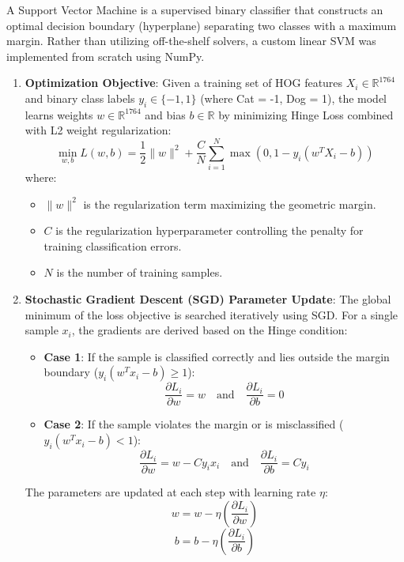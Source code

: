 \documentclass[12pt,a4paper]{article}
\begin{document}
A Support Vector Machine is a supervised binary classifier that constructs an optimal decision boundary (hyperplane) separating two classes with a maximum margin. Rather than utilizing off-the-shelf solvers, a custom linear SVM was implemented from scratch using NumPy.

\begin{enumerate}
    \item \textbf{Optimization Objective}: Given a training set of HOG features $X_i \in \mathbb{R}^{1764}$ and binary class labels $y_i \in \{-1, 1\}$ (where Cat = -1, Dog = 1), the model learns weights $w \in \mathbb{R}^{1764}$ and bias $b \in \mathbb{R}$ by minimizing Hinge Loss combined with L2 weight regularization:
    \begin{equation}
        \min_{w, b} L(w, b) = \frac{1}{2} \|w\|^2 + \frac{C}{N} \sum_{i=1}^{N} \max\left(0, 1 - y_i(w^T X_i - b)\right)
    \end{equation}
    where:
    \begin{itemize}
        \item $\|w\|^2$ is the regularization term maximizing the geometric margin.
        \item $C$ is the regularization hyperparameter controlling the penalty for training classification errors.
        \item $N$ is the number of training samples.
    \end{itemize}
    
    \item \textbf{Stochastic Gradient Descent (SGD) Parameter Update}: The global minimum of the loss objective is searched iteratively using SGD. For a single sample $x_i$, the gradients are derived based on the Hinge condition:
    \begin{itemize}
        \item \textbf{Case 1}: If the sample is classified correctly and lies outside the margin boundary ($y_i(w^T x_i - b) \geq 1$):
        \begin{equation}
            \frac{\partial L_i}{\partial w} = w \quad \text{and} \quad \frac{\partial L_i}{\partial b} = 0
        \end{equation}
        \item \textbf{Case 2}: If the sample violates the margin or is misclassified ($y_i(w^T x_i - b) < 1$):
        \begin{equation}
            \frac{\partial L_i}{\partial w} = w - C y_i x_i \quad \text{and} \quad \frac{\partial L_i}{\partial b} = C y_i
        \end{equation}
    \end{itemize}
    The parameters are updated at each step with learning rate $\eta$:
    \begin{equation}
        w = w - \eta \left(\frac{\partial L_i}{\partial w}\right)
    \end{equation}
    \begin{equation}
        b = b - \eta \left(\frac{\partial L_i}{\partial b}\right)
    \end{equation}
\end{enumerate}
\end{document}
